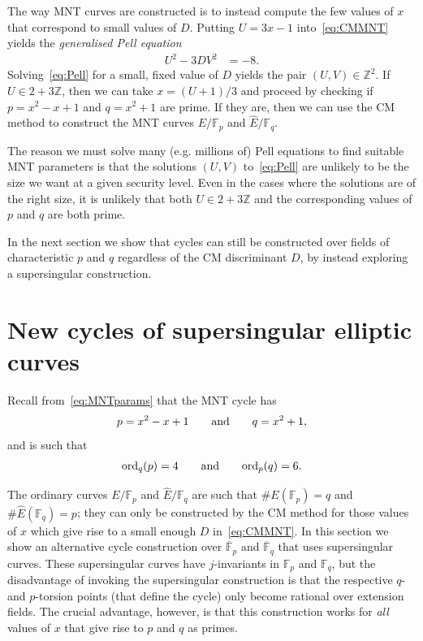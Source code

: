 \documentclass[version=preprint]{iacrcc}
\newcommand{\Z}{\mathbb{Z}}
\newcommand{\F}{\mathbb{F}}
\begin{document}
The way MNT curves are constructed is to instead compute the few values of $x$ that correspond to small values of $D$. Putting $U=3x-1$ into~\eqref{eq:CMMNT} yields the \emph{generalised Pell equation}
\begin{align}\label{eq:Pell}
U^2-3DV^2 &= -8.
\end{align}
Solving~\eqref{eq:Pell} for a small, fixed value of $D$ yields the pair $(U,V) \in \Z^2$. If $U \in 2+3\Z$, then we can take $x=(U+1)/3$ and proceed by checking if $p=x^2-x+1$ and $q=x^2+1$ are prime. If they are, then we can use the CM method to construct the MNT curves $E/\F_p$ and $\hat{E}/\F_q$. 

The reason we must solve many (e.g. millions of) Pell equations to find suitable MNT parameters is that the solutions $(U,V)$ to~\eqref{eq:Pell} are unlikely to be the size we want at a given security level. Even in the cases where the solutions are of the right size, it is unlikely that both $U \in 2+3\Z$ and the corresponding values of $p$ and $q$ are both prime. 

In the next section we show that cycles can still be constructed over fields of characteristic $p$ and $q$ regardless of the CM discriminant $D$, by instead exploring a supersingular construction. 


\section{New cycles of supersingular elliptic curves}\label{sec:superMNT}

Recall from~\eqref{eq:MNTparams} that the MNT cycle has 
\begin{align*}
p=x^2-x+1 \quad \quad {\rm and} \quad\quad q=x^2+1,
\end{align*}
and is such that 
\begin{align}\label{eq:ordpq}
{\rm ord}_q(p)=4 \quad \quad {\rm and} \quad\quad {\rm ord}_p(q)=6.
\end{align}

The ordinary curves $E/\F_p$ and $\hat{E}/\F_q$ are such that $\#E(\F_p)=q$ and $\#\hat{E}(\F_q)=p$; they can only be constructed by the CM method for those values of $x$ which give rise to a small enough $D$ in~\eqref{eq:CMMNT}. In this section we show an alternative cycle construction over $\overline{\F}_p$ and $\overline{\F}_q$ that uses supersingular curves. These supersingular curves have $j$-invariants in $\F_p$ and $\F_q$, but the disadvantage of invoking the supersingular construction is that the respective $q$- and $p$-torsion points (that define the cycle) only become rational over extension fields. The crucial advantage, however, is that this construction works for \emph{all} values of $x$ that give rise to $p$ and $q$ as primes. 
\end{document}
